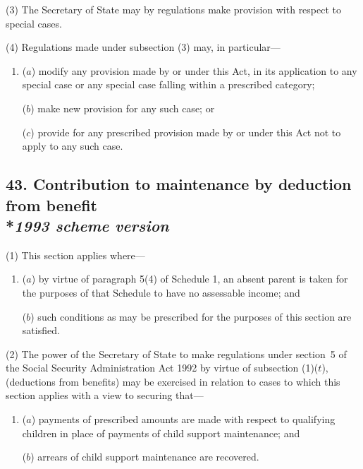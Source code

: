 \documentclass[12pt,a4paper]{article}
\begin{document}
(3) The Secretary of State may by regulations make provision with respect to special cases.

(4) Regulations made under subsection (3)  may, in particular—
\begin{enumerate}\item[]
($a$) modify any provision made by or under this Act, in its application to any special case or any special case falling within a prescribed category;

($b$) make new provision for any such case; or

($c$) provide for any prescribed provision made by or under this Act not to apply to any such case.
\end{enumerate}


\subsection[43. Contribution to maintenance by deduction from benefit --- \emph{1993 scheme version}]{43. Contribution to maintenance by deduction from benefit\\*\emph{1993 scheme version}}

(1) This section applies where—
\begin{enumerate}\item[]
($a$) by virtue of paragraph 5(4)  of Schedule 1, an absent parent is taken for the purposes of that Schedule to have no assessable income; and

($b$) such conditions as may be prescribed for the purposes of this section are satisfied.
\end{enumerate}

(2) The power of the Secretary of State to make regulations under 
section~5 of the Social Security Administration Act 1992 by virtue of subsection (1)($t$),  %
(deductions from benefits) may be exercised in relation to cases to which this section applies with a view to securing that—
\begin{enumerate}\item[]
($a$) payments of prescribed amounts are made with respect to qualifying children in place of payments of child support maintenance; and

($b$) arrears of child support maintenance are recovered.
\end{enumerate}
\end{document}
